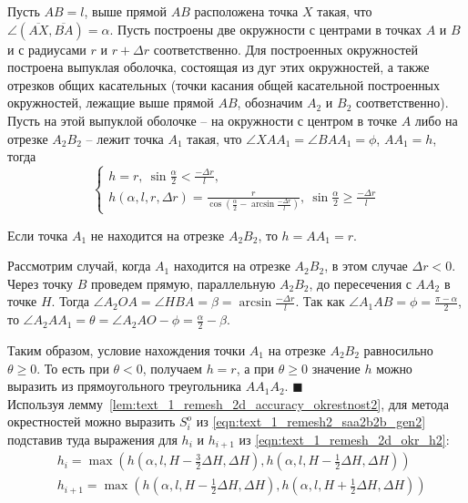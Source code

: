 \documentclass[
11pt,%
tightenlines,%
twoside,%
onecolumn,%
nofloats,%
nobibnotes,%
nofootinbib,%
superscriptaddress,%
noshowpacs,%
centertags]%
{revtex4}
\begin{document}
\begin{lemma}\label{lem:text_1_remesh_2d_accuracy_okrestnost2}
Пусть $AB = l$, выше прямой $AB$ расположена точка $X$ такая, что $\angle (\overline{AX}, \overline{BA}) = \alpha$.
Пусть построены две окружности с центрами в точках $A$ и $B$ и с радиусами $r$ и $r + \Delta r$ соответственно.
Для построенных окружностей построена выпуклая оболочка, состоящая из дуг этих окружностей, а также отрезков общих касательных (точки касания общей касательной построенных окружностей, лежащие выше прямой $AB$, обозначим $A_2$ и $B_2$ соответственно).
Пусть на этой выпуклой оболочке -- на окружности с центром в точке $A$ либо на отрезке $A_2B_2$ -- лежит точка $A_1$ такая, что $\angle XAA_1 = \angle BAA_1 = \phi$, $AA_1 = h$, тогда 
\begin{equation}
	\begin{cases}\label{eqn:text_1_remesh_2d_okr_h2}
		h = r, \ \sin \frac{\alpha}{2} < \frac{-\Delta r}{l}, \\
		h(\alpha, l, r, \Delta r) = \frac{r}{\cos \left( \frac{\alpha}{2} - \arcsin \frac{-\Delta r}{l} \right)}, \ \sin \frac{\alpha}{2} \ge \frac{-\Delta r}{l}
	\end{cases}
\end{equation}
\end{lemma}

Если точка $A_1$ не находится на отрезке $A_2B_2$, то $h = AA_1 = r$.

Рассмотрим случай, когда $A_1$ находится на отрезке $A_2B_2$, в этом случае $\Delta r < 0$.
Через точку $B$ проведем прямую, параллельную $A_2B_2$, до пересечения с $AA_2$ в точке $H$.
Тогда $\angle A_2OA = \angle HBA = \beta = \arcsin \frac{-\Delta r}{l}$.
Так как $\angle A_1AB = \phi = \frac{\pi - \alpha}{2}$, то $\angle A_2AA_1 = \theta = \angle A_2AO - \phi = \frac{\alpha}{2} - \beta$.

Таким образом, условие нахождения точки $A_1$ на отрезке $A_2B_2$ равносильно $\theta \ge 0$.
То есть при $\theta < 0$, получаем $h = r$, а при $\theta \ge 0$ значение $h$ можно выразить из прямоугольного треугольника $AA_1A_2$.
$\blacksquare$\\

Используя лемму~\ref{lem:text_1_remesh_2d_accuracy_okrestnost2}, для метода окрестностей можно выразить $S_i^o$ из \eqref{eqn:text_1_remesh2_saa2b2b_gen2} подставив туда выражения для $h_i$ и $h_{i + 1}$ из \eqref{eqn:text_1_remesh_2d_okr_h2}:
\begin{equation}
	\begin{aligned}
	& h_i = \max \left( h \left( \alpha, l, H - \frac{3}{2}\Delta H, \Delta H \right), h \left( \alpha, l, H - \frac{1}{2}\Delta H, \Delta H \right) \right) \\
	& h_{i + 1} = \max \left( h \left( \alpha, l, H - \frac{1}{2}\Delta H, \Delta H \right), h \left( \alpha, l, H + \frac{1}{2}\Delta H, \Delta H \right) \right)
	\end{aligned}
\end{equation}
\end{document}
